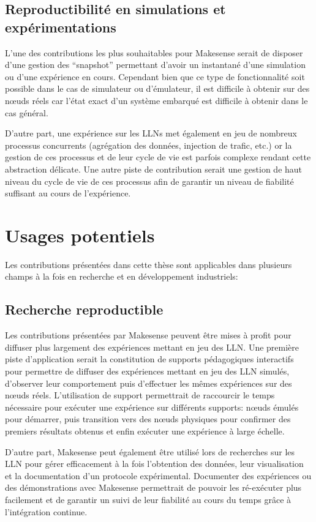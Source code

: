 \subsection{Reproductibilité en simulations et expérimentations}

L'une des contributions les plus souhaitables pour Makesense serait de disposer d'une gestion des ``snapshot'' permettant d'avoir un instantané d'une simulation ou d'une expérience en cours.
Cependant bien que ce type de fonctionnalité soit possible dans le cas de simulateur ou d'émulateur, il est difficile à obtenir sur des nœuds réels car l'état exact d'un système embarqué est difficile à obtenir dans le cas général.

D'autre part, une expérience sur les \ac{LLN}s met également en jeu de nombreux processus concurrents (agrégation des données, injection de trafic, etc.) or la gestion de ces processus et de leur cycle de vie est parfois complexe rendant cette abstraction délicate.
Une autre piste de contribution serait une gestion de haut niveau du cycle de vie de ces processus afin de garantir un niveau de fiabilité suffisant au cours de l'expérience.

\section{Usages potentiels}

Les contributions présentées dans cette thèse sont applicables dans plusieurs champs à la fois en recherche et en développement industriels:

\subsection{Recherche reproductible}

Les contributions présentées par Makesense peuvent être mises à profit pour diffuser plus largement des expériences mettant en jeu des \ac{LLN}.
Une première piste d'application serait la constitution de supports pédagogiques interactifs pour permettre de diffuser des expériences mettant en jeu des \ac{LLN} simulés, d'observer leur comportement puis d'effectuer les mêmes expériences sur des nœuds réels.
L'utilisation de support permettrait de raccourcir le temps nécessaire pour exécuter une expérience sur différents supports: nœuds émulés pour démarrer, puis transition vers des nœuds physiques pour confirmer des premiers résultats obtenus et enfin exécuter une expérience à large échelle.

D'autre part, Makesense peut également être utilisé lors de recherches sur les \ac{LLN} pour gérer efficacement à la fois l'obtention des données, leur visualisation et la documentation d'un protocole expérimental.
Documenter des expériences ou des démonstrations avec Makesense permettrait de pouvoir les ré-exécuter plus facilement et de garantir un suivi de leur fiabilité au cours du temps grâce à l'intégration continue.


